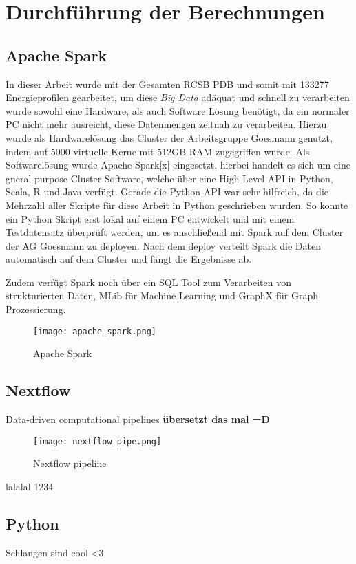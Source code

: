 \section{Durchführung der Berechnungen}


\subsection{Apache Spark}
In dieser Arbeit wurde mit der Gesamten RCSB PDB und somit mit 133277 Energieprofilen gearbeitet, um diese \emph{Big Data} adäquat und schnell zu verarbeiten wurde sowohl eine Hardware, als auch Software Lösung benötigt, da ein normaler PC nicht mehr ausreicht, diese Datenmengen zeitnah zu verarbeiten. Hierzu wurde als Hardwarelösung das Cluster der Arbeitsgruppe Goesmann genutzt, indem auf 5000 virtuelle Kerne mit 512GB RAM zugegriffen wurde. Als Softwarelösung wurde Apache Spark[x] eingesetzt, hierbei handelt es sich um eine gneral-purpose Cluster Software, welche über eine High Level API in Python, Scala, R und Java verfügt. Gerade die Python API war sehr hilfreich, da die Mehrzahl aller Skripte für diese Arbeit in Python geschrieben wurden. So konnte ein Python Skript erst lokal auf einem PC entwickelt und mit einem Testdatensatz überprüft werden, um es anschließend mit Spark auf dem Cluster der AG Goesmann zu deployen. Nach dem deploy verteilt Spark die Daten automatisch auf dem Cluster und fängt die Ergebnisse ab. 

Zudem verfügt Spark noch über ein SQL Tool zum Verarbeiten von strukturierten Daten, MLib für Machine Learning und GraphX für Graph Prozessierung.

\begin{figure}
\texttt{[image: apache\_spark.png]}
\caption{Apache Spark\protect\footnotemark}
\label{fig:apache_spark}
\end{figure}


\subsection{Nextflow}
Data-driven computational pipelines \textbf{übersetzt das mal =D}

\begin{figure}
\texttt{[image: nextflow\_pipe.png]}
\caption{Nextflow pipeline \protect\footnotemark}
\label{fig:nextflow_pipe}
\end{figure}

lalalal 1234

\subsection{Python}
Schlangen sind cool <3
